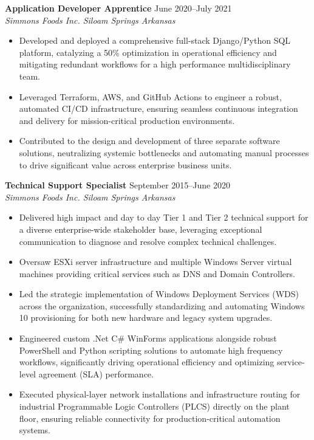\documentclass[10pt,a4paper]{article}
\begin{document}
\noindent\textbf{Application Developer Apprentice} \hfill June 2020--July 2021 \\
\textit{Simmons Foods Inc. \textbar{} Siloam Springs Arkansas}
\begin{itemize}[leftmargin=*, noitemsep, topsep=0pt]
    \item Developed and deployed a comprehensive full-stack Django/Python SQL platform, catalyzing a 50\% optimization in operational efficiency and mitigating redundant workflows for a high performance multidisciplinary team.
    \item Leveraged Terraform, AWS, and GitHub Actions to engineer a robust, automated CI/CD infrastructure, ensuring seamless continuous integration and delivery for mission-critical production environments.
    \item Contributed to the design and development of three separate software solutions, neutralizing systemic bottlenecks and automating manual processes to drive significant value across enterprise business units.
\end{itemize}
\vspace{2mm}

\noindent\textbf{Technical Support Specialist} \hfill September 2015--June 2020 \\
\textit{Simmons Foods Inc. \textbar{} Siloam Springs Arkansas}
\begin{itemize}[leftmargin=*, noitemsep, topsep=0pt]
    \item Delivered high impact and day to day Tier 1 and Tier 2 technical support for a diverse enterprise-wide stakeholder base, leveraging exceptional communication to diagnose and resolve complex technical challenges.
    \item Oversaw ESXi server infrastructure and multiple Windows Server virtual machines providing critical services such as DNS and Domain Controllers.
    \item Led the strategic implementation of Windows Deployment Services (WDS) across the organization, successfully standardizing and automating Windows 10 provisioning for both new hardware and legacy system upgrades.
    \item Engineered custom .Net C\# WinForms applications alongside robust PowerShell and Python scripting solutions to automate high frequency workflows, significantly driving operational efficiency and optimizing service-level agreement (SLA) performance.
    \item Executed physical-layer network installations and infrastructure routing for industrial Programmable Logic Controllers (PLCS) directly on the plant floor, ensuring reliable connectivity for production-critical automation systems.
\end{itemize}
\end{document}
